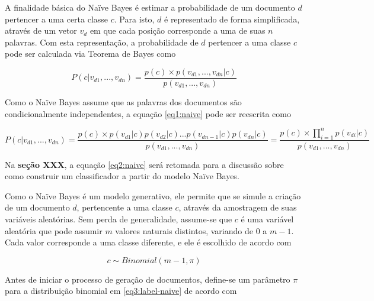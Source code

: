 A finalidade básica do Naïve Bayes é estimar a probabilidade de um documento \ensuremath{d} pertencer a uma certa classe \ensuremath{c}. Para isto, \ensuremath{d} é representado de forma simplificada, através de um vetor \ensuremath{v_d} em que cada posição corresponde a uma de suas \ensuremath{n} palavras. Com esta representação, a probabilidade de \ensuremath{d} pertencer a uma classe \ensuremath{c} pode ser calculada via Teorema de Bayes como


\begin{equation}
\label{eq1:naive}
\ensuremath{P(c | v_{d1}, ..., v_{dn}) = \frac{p(c) \times p(v_{d1}, ..., v_{dn} | c)}{p(v_{d1}, ..., v_{dn})} }
\end{equation}

Como o Naïve Bayes assume que as palavras dos documentos são condicionalmente independentes, a equação \ref{eq1:naive} pode ser reescrita como 

\begin{equation}
\label{eq2:naive}
\ensuremath{P(c | v_{d1}, ..., v_{dn}) = \frac{p(c) \times p(v_{d1} |  c)p(v_{d2} | c)...p(v_{dn - 1} | c)p(v_{dn} | c)}{p(v_{d1}, ..., v_{dn})} = \frac{p(c) \times \prod_{i = 1}^{n} p(v_{di} |  c)}{p(v_{d1}, ..., v_{dn})}}
\end{equation}

Na \textbf{seção XXX}, a equação \ref{eq2:naive} será retomada para a discussão sobre como construir um classificador a partir do modelo Naïve Bayes.

Como o Naïve Bayes é um modelo generativo, ele permite que se simule a criação de um documento \ensuremath{d}, pertencente a uma classe \ensuremath{c}, através da amostragem de suas variáveis aleatórias. Sem perda de generalidade, assume-se que \ensuremath{c} é uma variável aleatória que pode assumir \ensuremath{m} valores naturais distintos, variando de 0 a \ensuremath{m - 1}. Cada valor corresponde a uma classe diferente, e ele é escolhido de acordo com  

\begin{equation}
\label{eq3:label-naive}
\ensuremath{c \sim Binomial(m - 1, \pi)}
\end{equation}

Antes de iniciar o processo de geração de documentos, define-se um parâmetro \ensuremath{\pi} para a distribuição binomial em \ref{eq3:label-naive} de acordo com

